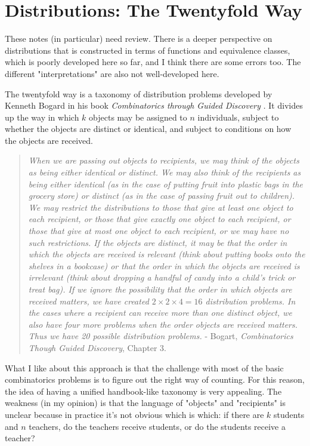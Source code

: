 \section{Distributions: The Twentyfold Way}
\label{twentyfoldway}

These notes (in particular)	 need review. There is a deeper perspective on distributions that is constructed in terms of functions and equivalence classes, which is poorly developed here so far, and I think there are some errors too. The different "interpretations" are also not well-developed here.

The twentyfold way is a taxonomy of distribution problems developed by Kenneth Bogard in his book \textit{Combinatorics through Guided Discovery} \cite{bogart2004combinatorics}. It divides up the way in which $k$ objects may be assigned to $n$ individuals, subject to whether the objects are distinct or identical, and subject to conditions on how the objects are received.


\begin{quote}
\textit{When we are passing out objects to recipients, we may think of the objects as being either identical or distinct. We may also think of the recipients as being either identical (as in the case of putting fruit into plastic bags in the grocery store) or distinct (as in the case of passing fruit out to children). We may restrict the distributions to those that give at least one object to each recipient, or those that give exactly one object to each recipient, or those that give at most one object to each recipient, or we may have no such restrictions. If the objects are distinct, it may be that the order in which the objects are received is relevant (think about putting books onto the shelves in a bookcase) or that the order in which the objects are received is irrelevant (think about dropping a handful of candy into a child’s trick or treat bag). If we ignore the possibility that the order in which objects are received matters, we have created $2\times2\times4 = 16$ distribution problems. In the cases where a recipient can receive more than one distinct object, we also have four more problems when the order objects are received matters. Thus we have 20 possible distribution problems.} - Bogart, \textit{Combinatorics Though Guided Discovery}, Chapter 3.
\end{quote}


What I like about this approach is that the challenge with most of the basic combinatorics problems is to figure out the right way of counting. For this reason, the idea of having a unified handbook-like taxonomy is very appealing. The weakness (in my opinion) is that the language of "objects" and "recipients" is unclear because in practice it's not obvious which is which: if there are $k$ students and $n$ teachers, do the teachers receive students, or do the students receive a teacher? 

